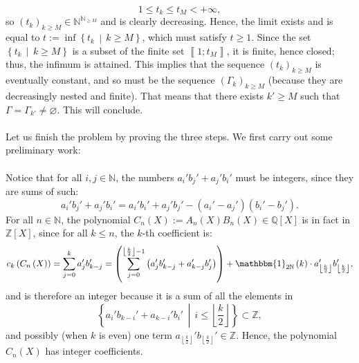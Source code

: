 \begin{solution}
    \[
        1 \leq t_k \leq t_M < +\infty,
    \]
    so \( \left( t_k \right)_{k \geq M} \in \mathbb{N}^{\mathbb{N}_{\geq M}} \) and is clearly decreasing. Hence, the limit exists and is equal to \( t := \inf \left\{ t_k \,\middle|\, k \geq M \right\} \), which must satisfy \( t \geq 1 \). Since the set \( \left\{ t_k \,\middle|\, k \geq M \right\} \) is a subset of the finite set \( \left\llbracket 1;t_{M}\right\rrbracket \), it is finite, hence closed; thus, the infimum is attained. This implies that the sequence \( \left( t_k \right)_{k \geq M} \) is eventually constant, and so must be the sequence \( \left( \Gamma_k \right)_{k \geq M} \) (because they are decreasingly nested and finite). That means that there exists \( k' \geq M \) such that \( \Gamma = \Gamma_{k'}\neq\varnothing \). This will conclude.
    \\\\
    Let us finish the problem by proving the three steps. We first carry out some preliminary work:
    \\\\
    Notice that for all \( i, j \in \mathbb{N} \), the numbers \( a_i'b_j' + a_j'b_i' \) must be integers, since they are sums of such:
    \[
        a_i'b_j' + a_j'b_i' = a_i'b_i' + a_j'b_j' - \left( a_i' - a_j' \right)\left( b_i' - b_j' \right).
    \]
    For all \( n \in \mathbb{N} \), the polynomial \( C_n\left(X\right) := A_n\left(X\right) B_n\left(X\right) \in \mathbb{Q}\left[X\right] \) is in fact in \( \mathbb{Z}\left[X\right] \), since for all \( k \leq n \), the \( k \)-th coefficient is:
    \[
        c_k\left( C_n\left(X\right) \right) = \sum_{j=0}^{k} a_j' b_{k-j}' = \left( \sum_{j=0}^{\left\lfloor \frac{k}{2} \right\rfloor - 1} \left( a_j' b_{k-j}' + a_{k-j}' b_j' \right) \right) + \mathbbm{1}_{2\mathbb{N}}\left(k\right) \cdot a_{\left\lfloor \frac{k}{2} \right\rfloor}' b_{\left\lfloor \frac{k}{2} \right\rfloor}',
    \]
    and is therefore an integer because it is a sum of all the elements in
    \[
        \left\{ a_i' b_{k-i}' + a_{k-i}' b_i' \,\middle|\, i \leq \left\lfloor \frac{k}{2} \right\rfloor \right\} \subset \mathbb{Z},
    \]
    and possibly (when \( k \) is even) one term \( a_{\left\lfloor \frac{k}{2} \right\rfloor}' b_{\left\lfloor \frac{k}{2} \right\rfloor}' \in \mathbb{Z} \). Hence, the polynomial \( C_n\left(X\right) \) has integer coefficients.
    \\\\

\end{solution}
